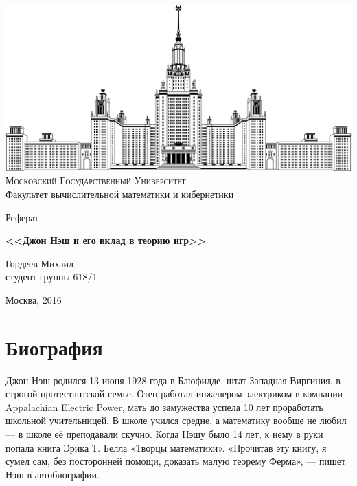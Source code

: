 \documentclass[12pt, a4paper]{article}
\let\stdsection\section
\renewcommand\section{\newpage\stdsection}
\begin{document}
\thispagestyle {empty}

\begin {center}
\ \vspace{-4cm}

\includegraphics [width = 0.5 \textwidth] {msu.png} \\
{\scshape Московский Государственный Университет} \\
Факультет вычислительной математики и кибернетики\\

\vspace {5cm}

{\LARGE Реферат}

\vspace {1cm}

{\Huge \bfseries
<<Джон Нэш и его вклад в теорию игр>> \\}
\end {center}

\vfill
\vfill

\begin {flushright}
  \large
  Гордеев Михаил \\
  студент группы 618/1 \\

  \vspace {5mm}
\end {flushright}

\vfill

\begin {center}
Москва, 2016
\end {center}

\enlargethispage {4 \baselineskip}

\tableofcontents

\section{Биография}
Джон Нэш родился 13 июня 1928 года в Блюфилде, штат Западная Виргиния,
в строгой протестантской семье. Отец работал инженером-электриком в компании
Appalachian Electric Power, мать до замужества успела 10 лет проработать
школьной учительницей. В школе учился средне, а математику вообще не 
любил — в школе её преподавали скучно. Когда Нэшу было 14 лет, к нему в руки 
попала книга Эрика Т. Белла «Творцы математики». «Прочитав эту книгу, я сумел 
сам, без посторонней помощи, доказать малую теорему Ферма», — пишет Нэш в 
автобиографии.
\end{document}
